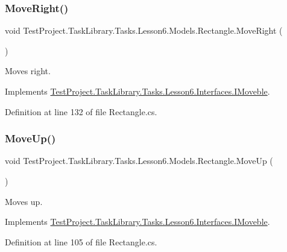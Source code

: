 \subsubsection{\texorpdfstring{MoveRight()}{MoveRight()}}
{\footnotesize\ttfamily void Test\+Project.\+Task\+Library.\+Tasks.\+Lesson6.\+Models.\+Rectangle.\+Move\+Right (\begin{DoxyParamCaption}{ }\end{DoxyParamCaption})}



Moves right. 



Implements \mbox{\hyperlink{interface_test_project_1_1_task_library_1_1_tasks_1_1_lesson6_1_1_interfaces_1_1_i_moveble_a1e6b39ff1e153b383e081f991501e742}{Test\+Project.\+Task\+Library.\+Tasks.\+Lesson6.\+Interfaces.\+I\+Moveble}}.



Definition at line 132 of file Rectangle.\+cs.

\mbox{\label{class_test_project_1_1_task_library_1_1_tasks_1_1_lesson6_1_1_models_1_1_rectangle_a67786139a7e5f852c0442423c6a52418}} 
\subsubsection{\texorpdfstring{MoveUp()}{MoveUp()}}
{\footnotesize\ttfamily void Test\+Project.\+Task\+Library.\+Tasks.\+Lesson6.\+Models.\+Rectangle.\+Move\+Up (\begin{DoxyParamCaption}{ }\end{DoxyParamCaption})}



Moves up. 



Implements \mbox{\hyperlink{interface_test_project_1_1_task_library_1_1_tasks_1_1_lesson6_1_1_interfaces_1_1_i_moveble_a2be55236c78ebdcac42f22d31abdf18e}{Test\+Project.\+Task\+Library.\+Tasks.\+Lesson6.\+Interfaces.\+I\+Moveble}}.



Definition at line 105 of file Rectangle.\+cs.


